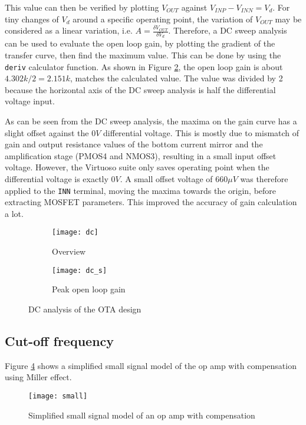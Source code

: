 This value can then be verified by plotting $V_{OUT}$ against $V_{INP} - V_{INN} = V_d$. For tiny changes of $V_d$ around a specific operating point, the variation of $V_{OUT}$ may be considered as a linear variation, i.e. $A = \frac{\delta V_{OUT}}{\delta V_d}$. Therefore, a DC sweep analysis can be used to evaluate the open loop gain, by plotting the gradient of the transfer curve, then find the maximum value. This can be done by using the \texttt{deriv} calculator function. As shown in Figure \ref{fig:dc_s}, the open loop gain is about $4.302k / 2 = 2.151k$, matches the calculated value. The value was divided by 2 because the horizontal axis of the DC sweep analysis is half the differential voltage input.

As can be seen from the DC sweep analysis, the maxima on the gain curve has a slight offset against the $0 V$ differential voltage. This is mostly due to mismatch of gain and output resistance values of the bottom current mirror and the amplification stage (PMOS4 and NMOS3), resulting in a small input offset voltage. However, the Virtuoso suite only saves operating point when the differential voltage is exactly $0 V$. A small offset voltage of $660\mu V$ was therefore applied to the \texttt{INN} terminal, moving the maxima towards the origin, before extracting MOSFET parameters. This improved the accuracy of gain calculation a lot.

\begin{figure}[!htb]
	\centering
	\begin{subfigure}[b]{0.45\textwidth}
		\texttt{[image: dc]}
		\caption{Overview}
		\label{fig:dc_o}
	\end{subfigure}
	\begin{subfigure}[b]{0.45\textwidth}
		\texttt{[image: dc\_s]}
		\caption{Peak open loop gain}
		\label{fig:dc_s}
	\end{subfigure}
	\caption{DC analysis of the OTA design}
	\label{fig:dc}
\end{figure}

\subsection{Cut-off frequency}

Figure \ref{fig:small} shows a simplified small signal model of the op amp with compensation using Miller effect.

\begin{figure}[!htb]
	\centering
	\texttt{[image: small]}
	\caption{Simplified small signal model of an op amp with compensation}
	\label{fig:small}
\end{figure}

